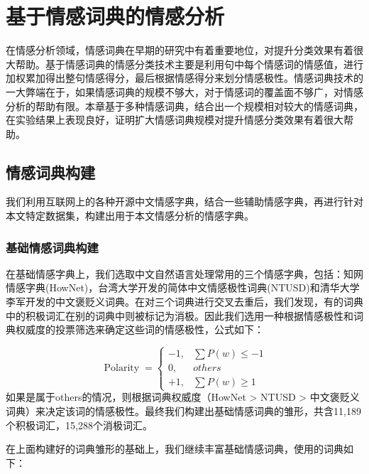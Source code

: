 \chapter{基于情感词典的情感分析}
在情感分析领域，情感词典在早期的研究中有着重要地位，对提升分类效果有着很大帮助。基于情感词典的情感分类技术主要是利用句中每个情感词的情感值，进行加权累加得出整句情感得分，最后根据情感得分来划分情感极性。情感词典技术的一大弊端在于，如果情感词典的规模不够大，对于情感词的覆盖面不够广，对情感分析的帮助有限。本章基于多种情感词典，结合出一个规模相对较大的情感词典，在实验结果上表现良好，证明扩大情感词典规模对提升情感分类效果有着很大帮助。

\section{情感词典构建}\label{section:情感词典构建}
我们利用互联网上的各种开源中文情感字典，结合一些辅助情感字典，再进行针对本文特定数据集，构建出用于本文情感分析的情感字典。

\subsection{基础情感词典构建}
在基础情感字典上，我们选取中文自然语言处理常用的三个情感字典，包括：知网情感字典(HowNet)\cite{hownet}，台湾大学开发的简体中文情感极性词典(NTUSD)\cite{NTU}和清华大学李军\cite{li2007experimental}开发的中文褒贬义词典。在对三个词典进行交叉去重后，我们发现，有的词典中的积极词汇在别的词典中则被标记为消极。因此我们选用一种根据情感极性和词典权威度的投票筛选来确定这些词的情感极性\cite{_hownet_2008}，公式如下：

\begin{equation}
\operatorname{Polarity}=\left\{\begin{array}{cc}
-1, &{\sum P(w) \leq-1}\\
0,  &{others}\\
+1, &{\sum P(w) \geq 1}
\end{array}\right.
\end{equation}
如果是属于others的情况，则根据词典权威度（HowNet > NTUSD > 中文褒贬义词典）来决定该词的情感极性。最终我们构建出基础情感词典的雏形，共含11,189个积极词汇，15,288个消极词汇。

在上面构建好的词典雏形的基础上，我们继续丰富基础情感词典，使用的词典如下：

